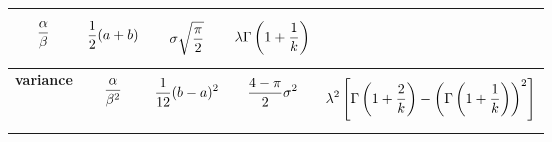 \documentclass{article}
\begin{document}
\begin{landscape}
\begin{center}
\begin{tabular}{c|c|c|c|c}
{\begin{align}
					\frac{\alpha}{\beta}\notag
				\end{align}}
				&
				\parbox{3cm}{\begin{align}
					\frac{1}{2}(a+b)\notag
					\end{align}}
				&
				\parbox{3cm}{\begin{align}
					\sigma\sqrt{\frac{\pi}{2}}\notag
				\end{align}}
				& 
				\parbox{3cm}{\begin{align}
					\lambda\Gamma\left(1+\frac{1}{k}\right)\notag
				\end{align}}
				\\
				\hline
				\textbf{variance} &
				\parbox{3cm}{\begin{align}
					\frac{\alpha}{\beta^2}\notag
				\end{align}}
				&
				\parbox{3cm}{\begin{align}
					\frac{1}{12}(b-a)^2\notag
					\end{align}}
				&
				\parbox{3cm}{\begin{align}
						\frac{4-\pi}{2}\sigma^2\notag
				\end{align}}
				&
				\parbox{3cm}{\begin{align}
					\lambda^2\left[\Gamma\left(1+\frac{2}{k}\right)-\left(\Gamma\left(1+\frac{1}{k}\right)\right)^2\right]\notag
				\end{align}}
				 \\
			\end{tabular}
		\end{center}
	\end{landscape}
\end{document}
